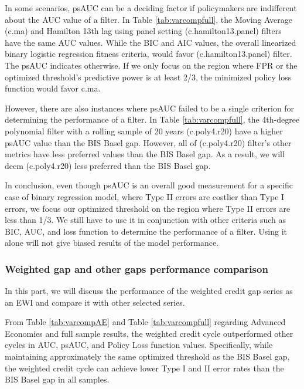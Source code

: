 \documentclass[
  12pt,
]{article}
\begin{document}
In some scenarios, psAUC can be a deciding factor if policymakers are indifferent about the AUC value of a filter. In Table \ref{tab:varcompfull}, the Moving Average (c.ma) and Hamilton 13th lag using panel setting (c.hamilton13.panel) filters have the same AUC values. While the BIC and AIC values, the overall linearized binary logistic regression fitness criteria, would favor (c.hamilton13.panel) filter. The psAUC indicates otherwise. If we only focus on the region where FPR or the optimized threshold's predictive power is at least 2/3, the minimized policy loss function would favor c.ma.

However, there are also instances where psAUC failed to be a single criterion for determining the performance of a filter. In Table \ref{tab:varcompfull}, the 4th-degree polynomial filter with a rolling sample of 20 years (c.poly4.r20) have a higher psAUC value than the BIS Basel gap. However, all of (c.poly4.r20) filter's other metrics have less preferred values than the BIS Basel gap. As a result, we will deem (c.poly4.r20) less preferred than the BIS Basel gap.

In conclusion, even though psAUC is an overall good measurement for a specific case of binary regression model, where Type II errors are costlier than Type I errors, we focus our optimized threshold on the region where Type II errors are less than 1/3. We still have to use it in conjunction with other criteria such as BIC, AUC, and loss function to determine the performance of a filter. Using it alone will not give biased results of the model performance.

\hypertarget{weighted-gap-and-other-gaps-performance-comparison}{%
\subsubsection{Weighted gap and other gaps performance comparison}\label{weighted-gap-and-other-gaps-performance-comparison}}

In this part, we will discuss the performance of the weighted credit gap series as an EWI and compare it with other selected series.

From Table \ref{tab:varcompAE} and Table \ref{tab:varcompfull} regarding Advanced Economies and full sample results, the weighted credit cycle outperformed other cycles in AUC, psAUC, and Policy Loss function values. Specifically, while maintaining approximately the same optimized threshold as the BIS Basel gap, the weighted credit cycle can achieve lower Type I and II error rates than the BIS Basel gap in all samples.
\end{document}
